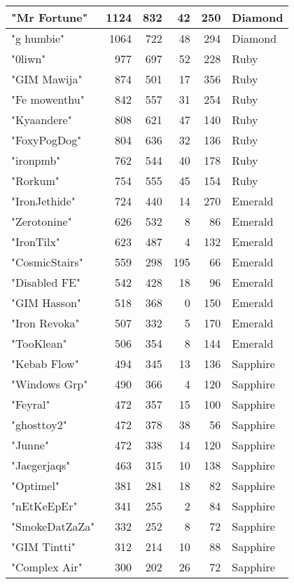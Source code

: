 \documentclass{article}
\begin{document}
\begin{table}[htbp]
\begin{tabular}{|l|r|r|r|r|l|}
"Mr Fortune" & 1124 & 832 & 42 & 250 & Diamond \\ \hline
"g humbie" & 1064 & 722 & 48 & 294 & Diamond \\ \hline
"0liwn" & 977 & 697 & 52 & 228 & Ruby \\ \hline
"GIM Mawija" & 874 & 501 & 17 & 356 & Ruby \\ \hline
"Fe mowenthu" & 842 & 557 & 31 & 254 & Ruby \\ \hline
"Kyaandere" & 808 & 621 & 47 & 140 & Ruby \\ \hline
"FoxyPogDog" & 804 & 636 & 32 & 136 & Ruby \\ \hline
"ironpmb" & 762 & 544 & 40 & 178 & Ruby \\ \hline
"Rorkum" & 754 & 555 & 45 & 154 & Ruby \\ \hline
"IronJethide" & 724 & 440 & 14 & 270 & Emerald \\ \hline
"Zerotonine" & 626 & 532 & 8 & 86 & Emerald \\ \hline
"IronTilx" & 623 & 487 & 4 & 132 & Emerald \\ \hline
"CosmicStairs" & 559 & 298 & 195 & 66 & Emerald \\ \hline
"Disabled FE" & 542 & 428 & 18 & 96 & Emerald \\ \hline
"GIM Hasson" & 518 & 368 & 0 & 150 & Emerald \\ \hline
"Iron Revoka" & 507 & 332 & 5 & 170 & Emerald \\ \hline
"TooKlean" & 506 & 354 & 8 & 144 & Emerald \\ \hline
"Kebab Flow" & 494 & 345 & 13 & 136 & Sapphire \\ \hline
"Windows Grp" & 490 & 366 & 4 & 120 & Sapphire \\ \hline
"Feyral" & 472 & 357 & 15 & 100 & Sapphire \\ \hline
"ghosttoy2" & 472 & 378 & 38 & 56 & Sapphire \\ \hline
"Junne" & 472 & 338 & 14 & 120 & Sapphire \\ \hline
"Jaegerjaqs" & 463 & 315 & 10 & 138 & Sapphire \\ \hline
"Optimel" & 381 & 281 & 18 & 82 & Sapphire \\ \hline
"nEtKeEpEr" & 341 & 255 & 2 & 84 & Sapphire \\ \hline
"SmokeDatZaZa" & 332 & 252 & 8 & 72 & Sapphire \\ \hline
"GIM Tintti" & 312 & 214 & 10 & 88 & Sapphire \\ \hline
"Complex Air" & 300 & 202 & 26 & 72 & Sapphire \\ \hline

\end{tabular}
\end{table}
\end{document}
